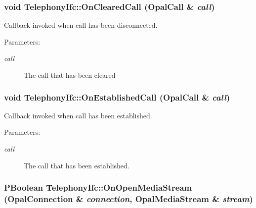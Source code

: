 \hypertarget{classTelephonyIfc_7efa2a51fd26f3c5072ee8b7ba09d75c}{
\subsubsection[{OnClearedCall}]{\setlength{\rightskip}{0pt plus 5cm}void TelephonyIfc::OnClearedCall (OpalCall \& {\em call})}}
\label{classTelephonyIfc_7efa2a51fd26f3c5072ee8b7ba09d75c}


Callback invoked when call has been disconnected. 

\begin{Desc}
\item[Parameters:]
\begin{description}
\item[{\em call}]The call that has been cleared \end{description}
\end{Desc}
\hypertarget{classTelephonyIfc_a482ebd5daf3bf5d69ec40a46a0616e9}{
\subsubsection[{OnEstablishedCall}]{\setlength{\rightskip}{0pt plus 5cm}void TelephonyIfc::OnEstablishedCall (OpalCall \& {\em call})}}
\label{classTelephonyIfc_a482ebd5daf3bf5d69ec40a46a0616e9}


Callback invoked when call has been established. 

\begin{Desc}
\item[Parameters:]
\begin{description}
\item[{\em call}]The call that has been established. \end{description}
\end{Desc}
\hypertarget{classTelephonyIfc_f3a2ff3766cf45c203dba5a2260445b1}{
\subsubsection[{OnOpenMediaStream}]{\setlength{\rightskip}{0pt plus 5cm}PBoolean TelephonyIfc::OnOpenMediaStream (OpalConnection \& {\em connection}, \/  OpalMediaStream \& {\em stream})}}
\label{classTelephonyIfc_f3a2ff3766cf45c203dba5a2260445b1}


